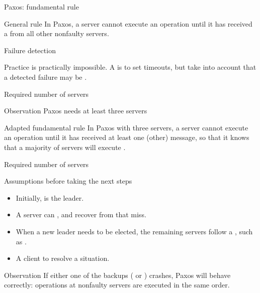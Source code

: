 \begin{slide}{Paxos: fundamental rule}
  \begin{alertblock}{General rule}
      In Paxos, a server  cannot execute an operation  until it has received a
       from all other nonfaulty servers.
  \end{alertblock}
\end{slide}
\begin{slide}{Failure detection}
  \begin{block}{Practice}
     is practically impossible. A  is to set timeouts, but take
    into account that a detected failure may be . 
  \end{block}
  \onslide
  \begin{center}
  \end{center}
\end{slide}
\begin{slide}{Required number of servers}
  \begin{alertblock}{Observation}
    Paxos needs at least three servers
  \end{alertblock}
  \onslide
  \begin{alertblock}{Adapted fundamental rule}
    In Paxos with three servers, a server  cannot execute an operation  until it has received at
    least one (other)  message, so that it knows that a majority of servers will
    execute .
  \end{alertblock}
\end{slide}
\begin{slide}{Required number of servers}
  \begin{block}{Assumptions before taking the next steps}
    \begin{itemize}\tightlist
    \item Initially,  is the leader. 
    \item A server can , and recover from that miss.
    \item When a new leader needs to be elected, the remaining servers follow a , such as  \mathexpr{\rightarrow}  \mathexpr{\rightarrow} .
    \item A client  to resolve a situation.
    \end{itemize}
  \end{block}
  \onslide
  \begin{alertblock}{Observation}
    If either one of the backups ( or ) crashes, Paxos will behave correctly: operations at
      nonfaulty servers are executed in the same order.
  \end{alertblock}
\end{slide}
